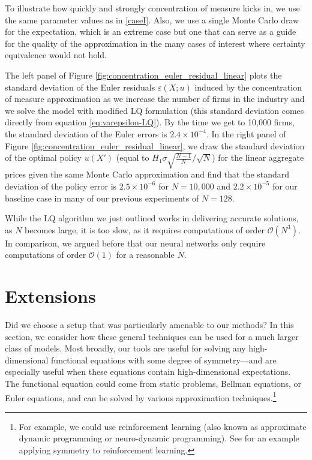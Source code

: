 \documentclass[12pt]{article}
\newcommand{\bigO}[1]{\ensuremath{\mathcal{O}(#1)}}
\begin{document}
To illustrate how quickly and strongly concentration of measure kicks in, we use the same parameter values as in \cref{caseI}. Also, we use a single Monte Carlo draw for the expectation, which is an extreme case but one that can serve as a guide for the quality of the approximation in the many cases of interest where certainty equivalence would not hold.

The left panel of Figure \ref{fig:concentration_euler_residual_linear} plots the standard deviation of the Euler residuals $\varepsilon(X;u)$ induced by the concentration of measure approximation as we increase the number of firms in the industry and we solve the model with modified LQ formulation (this standard deviation comes directly from equation \ref{eq:varepsilon-LQ}). By the time we get to 10,000 firms, the standard deviation of the Euler errors is $2.4\times 10^{-4}$. In the right panel of Figure \ref{fig:concentration_euler_residual_linear}, we draw the standard deviation of the optimal policy $u(X')$ (equal to $H_1\sigma\sqrt{\frac{N-1}{N}}/\sqrt{N}$) for the linear aggregate prices given the same Monte Carlo approximation and find that the standard deviation of the policy error is $2.5 \times 10^{-6}$ for $N=10,000$ and $2.2 \times 10^{-5}$ for our baseline case in many of our previous experiments of $N=128$.

While the LQ algorithm we just outlined works in delivering accurate solutions, as $N$ becomes large, it is too slow, as it requires computations of order \bigO{N^3}. In comparison, we argued before that our neural networks only require computations of order \bigO{1} for a reasonable $N$.

\section{Extensions}\label{sec:extensions}

Did we choose a setup that was particularly amenable to our methods? In this section, we consider how these general techniques can be used for a much larger class of models. Most broadly, our tools are useful for solving any high-dimensional functional equations with some degree of symmetry---and are especially useful when these equations contain high-dimensional expectations. The functional equation could come from static problems, Bellman equations, or Euler equations, and can be solved by various approximation techniques.\footnote{For example, we could use reinforcement learning (also known as approximate dynamic programming or neuro-dynamic programming). See \citet{van2020mdp} for an example applying symmetry to reinforcement learning.}
\end{document}
